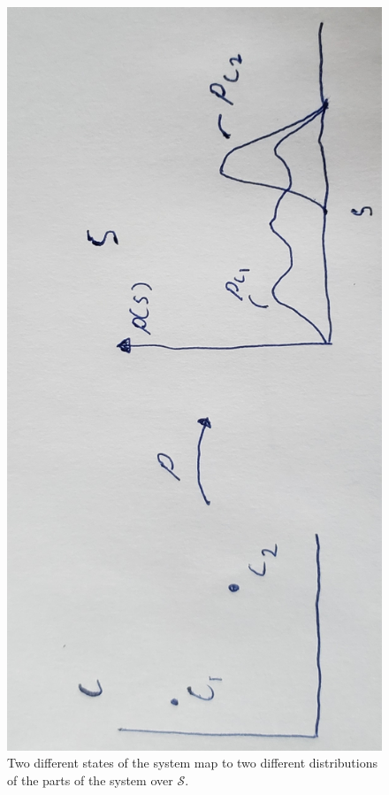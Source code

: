 \documentclass{article}
\begin{document}
\begin{figure}[!ht]
\centerline{\includegraphics[width=\textwidth,angle=-90,scale=.35]{diagram2.jpg}}
\caption{Two different states of the system map to two different distributions of the parts of the system over $\mathcal{S}$.}
\end{figure}
	
\end{document}
